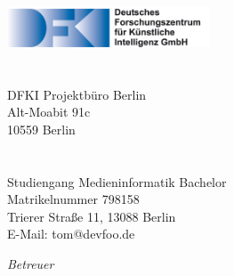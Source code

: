 \begin{titlepage}
	\tgherosfont
	\centering

	{\Large \thesisUniversity} \\[4mm]
	\includegraphics[width=6cm]{gfx/DFKI_Schrift_de} \\[2mm]
	\textsf{\thesisUniversityDepartment} \\
	\textsf{\thesisUniversityInstitute} \\[5mm]
    {\normalsize DFKI Projektbüro Berlin}\\
    {\normalsize Alt-Moabit 91c}\\
    {\normalsize 10559 Berlin}\\
	\vfill
	{\LARGE \color{ctcolortitle}\textbf{\thesisTitle} \\[10mm]}
	{\Large \thesisName} \\[5mm]
	{\normalsize Studiengang Medieninformatik Bachelor} \\
	{\normalsize Matrikelnummer 798158} \\
	{\normalsize Trierer Straße 11, 13088 Berlin} \\
	{\normalsize E-Mail: tom@devfoo.de} \\

	\vfill
	\begin{minipage}[t]{.27\textwidth}
		\raggedleft
		\textit{Betreuer}
	\end{minipage}
	\hspace*{15pt}
	\begin{minipage}[t]{.65\textwidth}
		{\Large \thesisFirstReviewer} \\
	  	{\small \thesisFirstReviewerDepartment} \\[-1mm]
		{\small \thesisFirstReviewerUniversity}
	\end{minipage} \\[5mm]
	\begin{minipage}[t]{.27\textwidth}
		\raggedleft
		\textit{ }
	\end{minipage}
	\hspace*{15pt}
	\begin{minipage}[t]{.65\textwidth}
		{\Large \thesisSecondReviewer} \\
	  	{\small \thesisSecondReviewerDepartment} \\[-1mm]
		{\small \thesisSecondReviewerUniversity}
	\end{minipage} \\[10mm]
	\thesisDate \\
\end{titlepage}